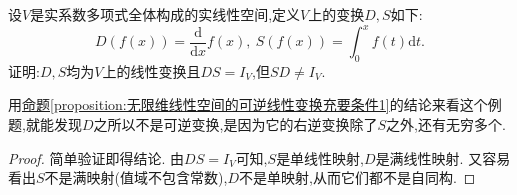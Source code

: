\documentclass[../../main.tex]{subfiles}%
\begin{document}
\begin{example}
设\(V\)是实系数多项式全体构成的实线性空间,定义\(V\)上的变换\(D,S\)如下:
\[
D(f(x))=\frac{\mathrm{d}}{\mathrm{d}x}f(x),\ S(f(x))=\int_{0}^{x}f(t)\mathrm{d}t.
\]
证明:\(D,S\)均为\(V\)上的线性变换且\(DS = I_V\),但\(SD\neq I_V\).
\end{example}
\begin{remark}
用\hyperref[proposition:无限维线性空间的可逆线性变换充要条件1]{命题\ref{proposition:无限维线性空间的可逆线性变换充要条件1}}的结论来看这个例题,就能发现\(D\)之所以不是可逆变换,是因为它的右逆变换除了\(S\)之外,还有无穷多个.
\end{remark}
\begin{proof}

简单验证即得结论. 由\(DS = I_V\)可知,\(S\)是单线性映射,\(D\)是满线性映射. 又容易看出\(S\)不是满映射(值域不包含常数),\(D\)不是单映射,从而它们都不是自同构.

\end{proof}
\end{document}

